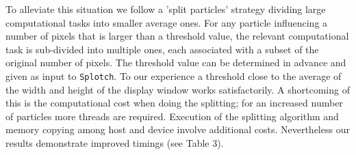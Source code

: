 \documentclass[1p,times]{elsarticle}
\begin{document}
To alleviate this situation we follow a 'split particles' strategy 
dividing large computational tasks into smaller average ones.  For any particle 
influencing a number of pixels that is larger than a threshold value, the relevant 
computational task is sub-divided into multiple ones, each associated with a subset 
of the original number of pixels. The threshold value 
can be determined in advance and given as input to {\tt Splotch}. To our experience a threshold close to 
the average of the width and height of the display window works satisfactorily. 
A shortcoming of this is the computational cost when doing the splitting; for an increased number of particles 
more threads are required. Execution of the splitting algorithm 
and memory copying among host and device involve additional costs. 
Nevertheless our results demonstrate improved timings (see Table 3).


\end{document}
